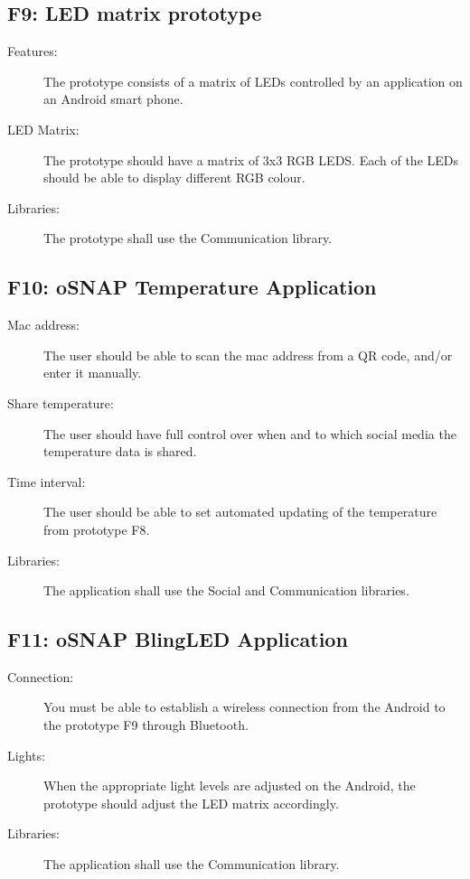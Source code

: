 \subsection{F9: LED matrix prototype}
\begin{description}
	\item[Features:] The prototype consists of a matrix of LEDs controlled by an application on 
	an Android smart phone.
	\item[LED Matrix:] The prototype should have a matrix of 3x3 RGB LEDS. Each of the LEDs should be able to display different RGB colour.
	\item[Libraries:] The prototype shall use the Communication library.
\end{description}

\subsection{F10: oSNAP Temperature Application}
\begin{description}
	\item[Mac address:] The user should be able to scan the mac address from a QR code, and/or enter it manually. 
	\item[Share temperature:] The user should have full control over when and to which social media the temperature data is shared.
	\item[Time interval:] The user should be able to set automated updating of the temperature from prototype F8.
	\item[Libraries:] The application shall use the Social and Communication libraries.
\end{description}

\subsection{F11: oSNAP BlingLED Application}
\begin{description}
	\item[Connection:] You must be able to establish a wireless connection from the Android to the prototype F9 through Bluetooth.
	\item[Lights:] When the appropriate light levels are adjusted on the Android, the prototype should adjust the LED matrix accordingly.
	\item[Libraries:] The application shall use the Communication library.
\end{description}

\newpage


